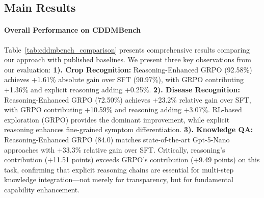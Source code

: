 \documentclass[11pt]{article}
\begin{document}








\subsection{Main Results}
\label{sec:results}

\paragraph{Overall Performance on CDDMBench}
Table~\ref{tab:cddmbench_comparison} presents comprehensive results comparing our approach with published baselines. %
We present three key observations from our evaluation: 
\textbf{1). Crop Recognition:} Reasoning-Enhanced GRPO (92.58\%) achieves +1.61\% absolute gain over SFT (90.97\%), with GRPO contributing +1.36\% and explicit reasoning adding +0.25\%. 
\textbf{2). Disease Recognition:} Reasoning-Enhanced GRPO (72.50\%) achieves +23.2\% relative gain over SFT, with GRPO contributing +10.59\% and reasoning adding +3.07\%. RL-based exploration (GRPO) provides the dominant improvement, while explicit reasoning enhances fine-grained symptom differentiation. 
\textbf{3). Knowledge QA:} Reasoning-Enhanced GRPO (84.0) matches state-of-the-art Gpt-5-Nano approaches with +33.3\% relative gain over SFT. Critically, reasoning's contribution (+11.51 points) exceeds GRPO's contribution (+9.49 points) on this task, confirming that explicit reasoning chains are essential for multi-step knowledge integration—not merely for transparency, but for fundamental capability enhancement.
\end{document}
